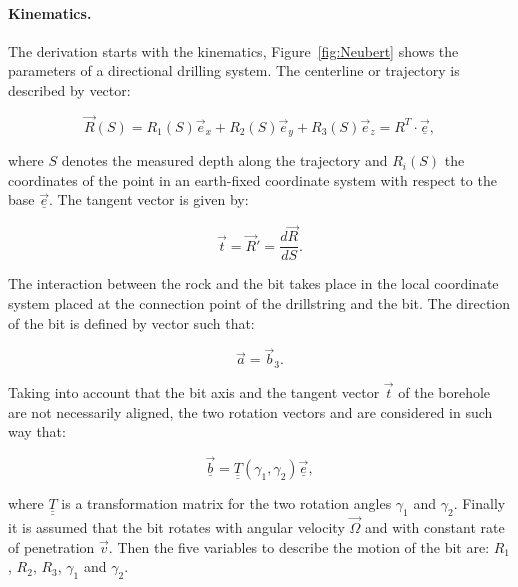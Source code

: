 \paragraph{Kinematics.}The derivation starts with the kinematics, Figure~\ref{fig:Neubert} shows the parameters of a directional drilling system. The centerline or trajectory is described by vector:

\begin{equation}
\vec{R}(S) = R_1(S) \vec{e}_x + R_2(S) \vec{e}_y + R_3(S) \vec{e}_z = R^T \cdot \vec{\underline{e}},
\end{equation}

where $S$ denotes the measured depth along the trajectory and $R_i(S)$ the coordinates of the point in an earth-fixed coordinate system with respect to the base $\vec{\underline{e}}$. The tangent vector  is given by:

\begin{equation}
	\vec{t} = \vec{R}' = \frac{d\vec{R}}{dS}.
\end{equation}

The interaction between the rock and the bit takes place in the local coordinate system  placed at the connection point of the drillstring and the bit. The direction of the bit is defined by vector  such that:

\begin{equation}
	\vec{a} = \vec{b}_3.
\end{equation}

Taking into account that the bit axis and the tangent vector $\vec{t}$ of the borehole are not necessarily aligned, the two rotation vectors  and   are considered in such way that:

\begin{equation}
	\vec{\underline{b}} = \underline{\underline{T}}(\gamma_1,\gamma_2)  \vec{\underline{e}},
\end{equation}

where $\underline{\underline{T}}$ is a transformation matrix for the two rotation angles $\gamma_1$ and $\gamma_2$. Finally it is assumed that the bit rotates with angular velocity $\vec{\Omega}$ and with constant rate of penetration $\vec{v}$. Then the five variables to describe the motion of the bit are: $R_1$, $R_2$, $R_3$, $\gamma_1$ and $\gamma_2$.

